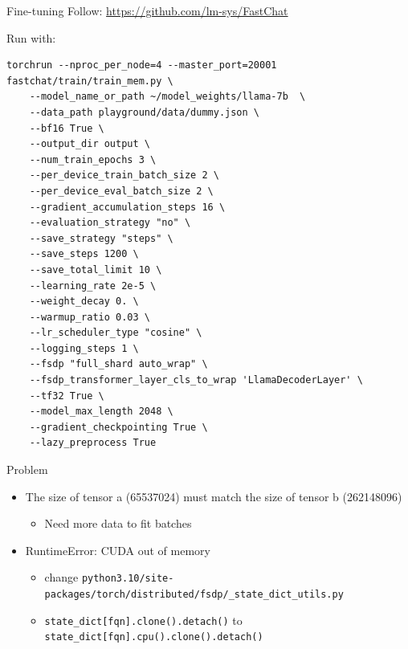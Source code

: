 \documentclass[aspectratio=1610,xcolor={dvipsnames},hyperref={colorlinks,unicode,linkcolor=violet,anchorcolor=BlueViolet,citecolor=YellowOrange,filecolor=black,urlcolor=Aquamarine}]{beamer}
\begin{document}
\begin{frame}[label={sec:orgfb03ef6},fragile]{Fine-tuning}
 Follow: \url{https://github.com/lm-sys/FastChat}

Run with:

\begin{verbatim}
torchrun --nproc_per_node=4 --master_port=20001 fastchat/train/train_mem.py \
    --model_name_or_path ~/model_weights/llama-7b  \
    --data_path playground/data/dummy.json \
    --bf16 True \
    --output_dir output \
    --num_train_epochs 3 \
    --per_device_train_batch_size 2 \
    --per_device_eval_batch_size 2 \
    --gradient_accumulation_steps 16 \
    --evaluation_strategy "no" \
    --save_strategy "steps" \
    --save_steps 1200 \
    --save_total_limit 10 \
    --learning_rate 2e-5 \
    --weight_decay 0. \
    --warmup_ratio 0.03 \
    --lr_scheduler_type "cosine" \
    --logging_steps 1 \
    --fsdp "full_shard auto_wrap" \
    --fsdp_transformer_layer_cls_to_wrap 'LlamaDecoderLayer' \
    --tf32 True \
    --model_max_length 2048 \
    --gradient_checkpointing True \
    --lazy_preprocess True
\end{verbatim}
\end{frame}

\begin{frame}[label={sec:org58b8dc0},fragile]{Problem}
 \begin{itemize}
\item The size of tensor a (65537024) must match the size of tensor b (262148096)
\begin{itemize}
\item Need more data to fit batches
\end{itemize}
\item RuntimeError: CUDA out of memory
\begin{itemize}
\item change \texttt{python3.10/site-packages/torch/distributed/fsdp/\_state\_dict\_utils.py}
\item \texttt{state\_dict[fqn].clone().detach()} to \texttt{state\_dict[fqn].cpu().clone().detach()}
\end{itemize}
\end{itemize}
\end{frame}
\end{document}
